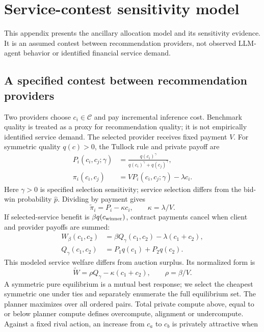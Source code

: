 \documentclass[sigconf,anonymous,nonacm]{acmart}
\begin{document}
\section{Service-contest sensitivity model}\label{app:servicecontest}
This appendix presents the ancillary allocation model and its sensitivity evidence. It is an assumed contest between recommendation providers, not observed LLM-agent behavior or identified financial service demand.

\subsection{A specified contest between recommendation providers}
Two providers choose $c_i\in\mathcal C$ and pay incremental inference cost. Benchmark quality is treated as a proxy for recommendation quality; it is not empirically identified service demand. The selected provider receives fixed payment $V$. For symmetric quality $q(c)>0$, the Tullock rule and private payoff are
\begin{equation}\begin{aligned}
P_i(c_i,c_j;\gamma)&=\frac{q(c_i)^\gamma}{q(c_i)^\gamma+q(c_j)^\gamma},\\
\pi_i(c_i,c_j)&=VP_i(c_i,c_j;\gamma)-\lambda c_i.
\end{aligned}\label{eq:contest}\end{equation}
Here $\gamma>0$ is specified selection sensitivity; service selection differs from the bid-win probability $\widehat p$. Dividing by payment gives
\begin{equation}
\widetilde\pi_i=P_i-\kappa c_i,\qquad \kappa=\lambda/V.
\label{eq:normalizedprivate}\end{equation}
If selected-service benefit is $\beta q(c_{\rm winner})$, contract payments cancel when client and provider payoffs are summed:
\begin{equation}\begin{aligned}
W_\beta(c_1,c_2)&=\beta Q_\gamma(c_1,c_2)-\lambda(c_1+c_2),\\
Q_\gamma(c_1,c_2)&=P_1q(c_1)+P_2q(c_2).
\end{aligned}\label{eq:welfare}\end{equation}
This modeled service welfare differs from auction surplus. Its normalized form is
\begin{equation}
\widetilde W=\rho Q_\gamma-\kappa(c_1+c_2),\qquad \rho=\beta/V.
\label{eq:normalizedwelfare}\end{equation}
A symmetric pure equilibrium is a mutual best response; we select the cheapest symmetric one under ties and separately enumerate the full equilibrium set. The planner maximizes over all ordered pairs. Total private compute above, equal to or below planner compute defines overcompute, alignment or undercompute. Against a fixed rival action, an increase from $c_a$ to $c_b$ is privately attractive when
\end{document}
